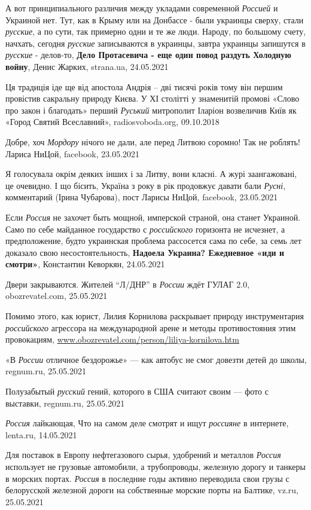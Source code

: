 А вот принципиального различия между укладами современной \emph{Россией} и
Украиной нет. Тут, как в Крыму или на Донбассе - были украинцы сверху, стали
\emph{русские}, а по сути, так примерно одни и те же люди. Народу, по большому
счету, начхать, сегодня \emph{русские} записываются в украинцы, завтра украинцы
запишутся в \emph{русские} - делов-то, \textbf{Дело Протасевича - еще один
повод раздуть Холодную войну}, Денис Жарких, strana.ua, 24.05.2021

Ця традиція іде ще від апостола Андрія – дві тисячі років тому він першим
провістив сакральну природу Києва. У ХІ столітті у знаменитій промові «Слово
про закон і благодать» перший \emph{Руський} митрополит Іларіон возвеличив Київ
як «Город Святий Всеславний», radiosvoboda.org, 09.10.2018

Добре, хоч \emph{Мордору} нічого не дали, але перед Литвою соромно! Так не
роблять! Лариса НиЦой, facebook, 23.05.2021

Я голосувала окрім деяких інших і за Литву, вони класні. А журі заангажовані,
це очевидно. І що бісить, Україна з року в рік продовжує давати бали
\emph{Русні}, комментарий (Ірина Чубарова), пост Ларисы НиЦой, facebook,
23.05.2021

Если \emph{Россия} не захочет быть мощной, имперской страной, она станет
Украиной. Само по себе майданное государство с \emph{российского} горизонта не
исчезнет, а предположение, будто украинская проблема рассосется сама по себе,
за семь лет доказало свою несостоятельность, \textbf{Надоела Украина? Ежедневное «иди и
смотри»}, Константин Кеворкян, 24.05.2021

Двери закрываются. Жителей \enquote{Л/ДНР} в \emph{России} ждёт ГУЛАГ 2.0,
obozrevatel.com, 25.05.2021

Помимо этого, как юрист, Лилия Корнилова раскрывает природу инструментария
\emph{российского} агрессора на международной арене и методы противостояния
этим провокациям, \url{www.obozrevatel.com/person/liliya-kornilova.htm}

«В \emph{России} отличное бездорожье» — как автобус не смог довезти детей до
школы, regnum.ru, 25.05.2021

Полузабытый \emph{русский} гений, которого в США считают своим — фото с
выставки, regnum.ru, 25.05.2021

\emph{Россия} лайкающая, Что на самом деле смотрят и ищут \emph{россияне} в
интернете, lenta.ru, 14.05.2021

Для поставок в Европу нефтегазового сырья, удобрений и металлов \emph{Россия}
использует не грузовые автомобили, а трубопроводы, железную дорогу и танкеры в
морских портах. \emph{Россия} в последние годы активно переводила свои грузы с
белорусской железной дороги на собственные морские порты на Балтике, vz.ru,
25.05.2021

